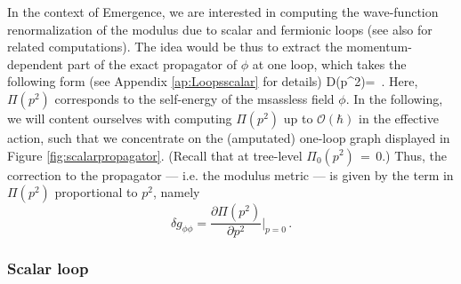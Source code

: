 In the context of Emergence, we are interested in computing the wave-function renormalization of the modulus due to scalar and fermionic loops (see also \cite{Heidenreich:2018kpg, Hamada:2021yxy} for related computations). The idea would be thus to extract the momentum-dependent part of the exact propagator of $\phi$ at one loop, which takes the following form (see Appendix \ref{ap:Loopsscalar} for details)
%
\beq
	\label{eq:scalarpropagator}
	D(p^2)=\, .
\eeq
%
Here, $\Pi(p^2)$ corresponds to the self-energy of the msassless field $\phi$. In the following, we will content ourselves with computing $\Pi(p^2)$ up to $\mathcal{O}(\hbar)$ in the effective action, such that we concentrate on the (amputated) one-loop graph displayed in Figure \ref{fig:scalarpropagator}. (Recall that at tree-level $\Pi_0(p^2)\, = \, 0$.) Thus, the correction to the propagator --- i.e. the modulus metric --- is given by the term in $\Pi(p^2)$ proportional to $p^2$, namely
%
\begin{equation}\label{eq:metriccorrection}
		\delta g_{\phi \phi}= \frac {\partial \Pi(p^2)}{\partial p^2} \bigg\rvert_{p=0}\, .
\end{equation}
%
	
\subsubsection*{Scalar loop}
	
